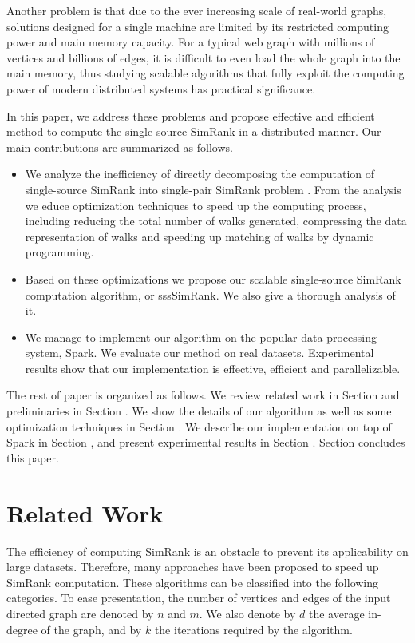\documentclass[conference]{IEEEtran}
\theoremstyle{definition}
\theoremstyle{definition}
\newcommand{\rom}[1]{\uppercase\expandafter{\romannumeral #1\relax}}
\begin{document}
Another problem is that due to the ever increasing scale of real-world  graphs, solutions designed for a single machine are limited by its restricted computing power and main memory capacity. 
For a typical web graph with millions of vertices and billions of edges, it is difficult to even load the whole graph into the main memory, thus studying scalable algorithms that fully exploit the computing power of modern distributed systems has practical  significance.

In this paper, we address these problems and propose effective and efficient method to compute the single-source SimRank in a distributed manner. 
Our main contributions are summarized as follows. 
\begin{itemize}
\item We analyze the inefficiency of directly decomposing the computation of single-source SimRank into single-pair SimRank problem \cite{li2010fast}. 
 From the analysis we educe  optimization techniques to speed up the computing process, including  reducing the total number of walks generated,  compressing the data representation of walks and speeding up matching of walks by dynamic programming.

\item Based on these optimizations we propose our scalable single-source SimRank computation algorithm, or sssSimRank. 
We also give a thorough analysis of it.
 
\item We manage to implement our algorithm on the popular  data processing system, Spark. 
We evaluate our method on real datasets. Experimental results show that our implementation is effective, efficient and parallelizable. 
\end{itemize}

The rest of paper is organized as follows. We review related work in Section \rom{2} and preliminaries in Section \rom{3}.
 We show the details of our algorithm as well as some optimization techniques in Section \rom{4}.
 We describe our implementation on top of Spark in Section \rom{5}, and present experimental results in Section \rom{6}.
 Section \rom{7} concludes this paper.

\section{Related Work}
The efficiency of computing SimRank is an obstacle to prevent its applicability on large datasets.
Therefore, many approaches have been proposed to speed up SimRank computation.
These algorithms can be classified into the following categories.
 To ease presentation, the number of vertices and edges of the input directed graph are denoted by $n$ and $m$.  
 We also denote by $d$ the average in-degree of the graph, and by $k$ the iterations required by the algorithm.
\end{document}

